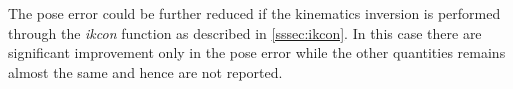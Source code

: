 \begin{figure}
	\hspace{1cm}
	\hspace{1cm}
\end{figure}	
\newpage
The pose error could be further reduced if the kinematics inversion is performed through the \textit{ikcon} function as described in \ref{sssec:ikcon}. In this case there are significant improvement only in the pose error while the other quantities remains almost the same and hence are not reported.
